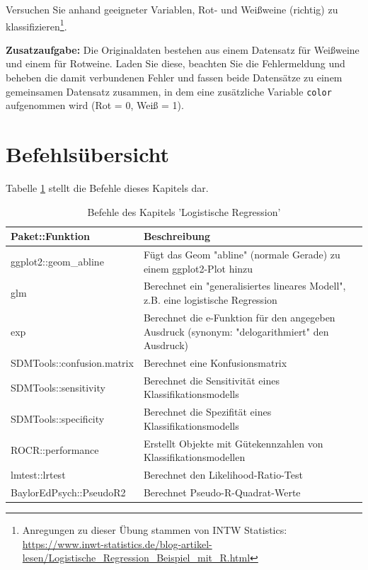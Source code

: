 \documentclass[12pt,ngerman,]{book}
\let\rmarkdownfootnote\footnote%
\def\footnote{\protect\rmarkdownfootnote}
\begin{document}
Versuchen Sie anhand geeigneter Variablen, Rot- und Weißweine (richtig)
zu klassifizieren\footnote{Anregungen zu dieser Übung stammen von INTW
  Statistics:
  \url{https://www.inwt-statistics.de/blog-artikel-lesen/Logistische_Regression_Beispiel_mit_R.html}}.

\textbf{Zusatzaufgabe:} Die Originaldaten bestehen aus einem Datensatz
für Weißweine und einem für Rotweine. Laden Sie diese, beachten Sie die
Fehlermeldung und beheben die damit verbundenen Fehler und fassen beide
Datensätze zu einem gemeinsamen Datensatz zusammen, in dem eine
zusätzliche Variable \texttt{color} aufgenommen wird (Rot = 0, Weiß =
1).

\section{Befehlsübersicht}\label{befehlsubersicht-7}

Tabelle \ref{tab:befehle-logist-regression} stellt die Befehle dieses
Kapitels dar.

\begin{table}

\caption{\label{tab:befehle-logist-regression}Befehle des Kapitels 'Logistische Regression'}
\centering
\begin{tabular}[t]{l|l}
\hline
Paket::Funktion & Beschreibung\\
\hline
ggplot2::geom\_abline & Fügt das Geom "abline" (normale Gerade) zu einem ggplot2-Plot hinzu\\
\hline
glm & Berechnet ein "generalisiertes lineares Modell", z.B. eine logistische Regression\\
\hline
exp & Berechnet die e-Funktion für den angegeben Ausdruck (synonym: "delogarithmiert" den Ausdruck)\\
\hline
SDMTools::confusion.matrix & Berechnet eine Konfusionsmatrix\\
\hline
SDMTools::sensitivity & Berechnet die Sensitivität eines Klassifikationsmodells\\
\hline
SDMTools::specificity & Berechnet die Spezifität eines Klassifikationsmodells\\
\hline
ROCR::performance & Erstellt Objekte mit Gütekennzahlen von Klassifikationsmodellen\\
\hline
lmtest::lrtest & Berechnet den Likelihood-Ratio-Test\\
\hline
BaylorEdPsych::PseudoR2 & Berechnet Pseudo-R-Quadrat-Werte\\
\hline
\end{tabular}
\end{table}
\end{document}
